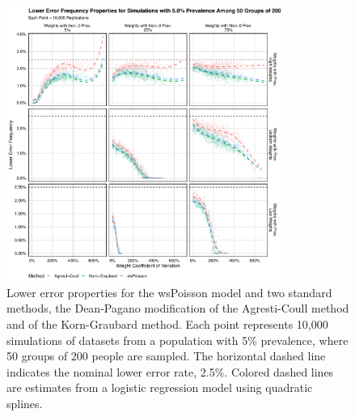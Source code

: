 \begin{figure}
\centering
\includegraphics[width=0.8\textwidth]{perfect_lower_error_frequency_50_groups_0_05_prev}
\caption{Lower error properties for the wsPoisson model and two standard methods, the Dean-Pagano modification of the Agresti-Coull method and of the Korn-Graubard method.
Each point represents 10,000 simulations of datasets from a population with 5\% prevalence, where 50 groups of 200 people are sampled.
The horizontal dashed line indicates the nominal lower error rate, 2.5\%.
Colored dashed lines are estimates from a logistic regression model using quadratic splines.}
\label{ch_3:fig:perfect_lower_error_frequency_50_groups_0_05_prev}
\end{figure}

